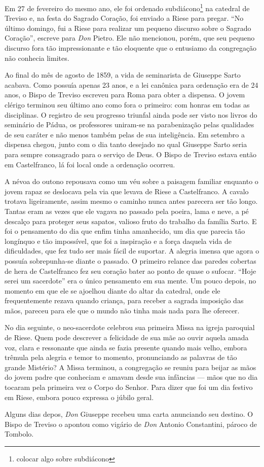 \documentclass[12pt,a4paper,oneside]{book}
\begin{document}
\quad Em 27 de fevereiro do mesmo ano, ele foi ordenado subdiácono\footnote[3]{colocar algo sobre subdiácono} na catedral de Treviso e, na festa do Sagrado Coração, foi enviado a Riese para pregar. ``No último domingo, fui a Riese para realizar um pequeno discurso sobre o Sagrado Coração'', escreve para \emph{Don} Pietro. Ele não mencionou, porém, que seu pequeno discurso fora tão impressionante e tão eloquente que o entusiamo da congregação não conhecia limites.

\quad Ao final do mês de agosto de 1859, a vida de seminarista de Giuseppe Sarto acabava. Como possuía apenas 23 anos, e a lei canônica para ordenação era de 24 anos, o Bispo de Treviso escreveu para Roma para obter a dispensa. O jovem clérigo terminou seu último ano como fora o primeiro: com honras em todas as disciplinas. O registro de seu progresso triunfal ainda pode ser visto nos livros do seminário de Pádua, os professores uniram-se na parabenização pelas qualidades de seu caráter e não menos também pelas de sua inteligência. Em setembro a dispensa chegou, junto com o dia tanto desejado no qual Giuseppe Sarto seria para sempre consagrado para o serviço de Deus. O Bispo de Treviso estava então em Castelfranco, lá foi local onde a ordenação ocorreu.

\quad A névoa do outono repousava como um véu sobre a paisagem familiar enquanto o jovem rapaz se deslocava pela via que levava de Riese a Castelfranco. A cavalo trotava ligeiramente, assim mesmo o caminho nunca antes parecera ser tão longo. Tantas eram as vezes que ele vagava no passado pela poeira, lama e neve, a pé descalço para proteger seus sapatos, valioso fruto do trabalho da família Sarto. E foi o pensamento do dia que enfim tinha amanhecido, um dia que parecia tão longínquo e tão impossível, que foi a inspiração e a força daquela vida de dificuldades, que fez tudo ser mais fácil de suportar. A alegria imensa que agora o possuía sobrepunha-se diante o passado. O primeiro relance das paredes cobertas de hera de Castelfranco fez seu coração bater ao ponto de quase o sufocar. ``Hoje serei um sacerdote'' era o único pensamento em sua mente. Um pouco depois, no momento em que ele se ajoelhou diante do altar da catedral, onde ele frequentemente rezava quando criança, para receber a sagrada imposição das mãos, pareceu para ele que o mundo não tinha mais nada para lhe oferecer.

\quad No dia seguinte, o neo-sacerdote celebrou sua primeira Missa na igreja paroquial de Riese. Quem pode descrever a felicidade de sua mãe ao ouvir aquela amada voz, clara e ressonante que ainda se fazia presente quando mais velho, embora trêmula pela alegria e temor to momento, pronunciando as palavras de tão grande Mistério? A Missa terminou, a congregação se reuniu para beijar as mãos do jovem padre que conheciam e amavam desde sua infâncias --- mãos que no dia tocaram pela primeira vez o Corpo do Senhor. Para dizer que foi um dia festivo em Riese, embora pouco expressa o júbilo geral.

\quad Alguns dias depos, \emph{Don} Giuseppe recebeu uma carta anunciando seu destino. O Bispo de Treviso o apontou como vigário de \emph{Don} Antonio Constantini, pároco de Tombolo.
\end{document}
